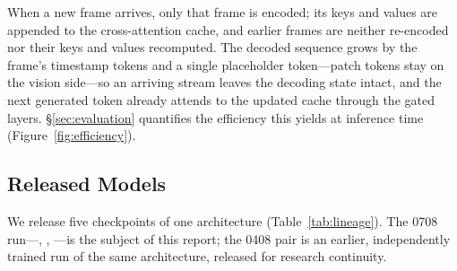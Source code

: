 When a new frame arrives, only that frame is encoded; its keys and
values are appended to the cross-attention cache, and earlier frames
are neither re-encoded nor their keys and values recomputed. The
decoded sequence grows by the frame's
timestamp tokens and a single placeholder token---patch tokens stay on
the vision side---so an arriving stream leaves the decoding state
intact, and the next generated token already attends to the updated
cache through the gated layers.
\S\ref{sec:evaluation} quantifies the efficiency this
yields at inference time (Figure~\ref{fig:efficiency}).

\subsection{Released Models}\label{sec:released-models}

We release five checkpoints of one architecture
(Table~\ref{tab:lineage}). The 0708 run---\mossbase{},
\mossinstruct{}, \mossrealtime{}---is the subject of this report; the
0408 pair is an earlier, independently trained run of the same
architecture, released for research continuity.
